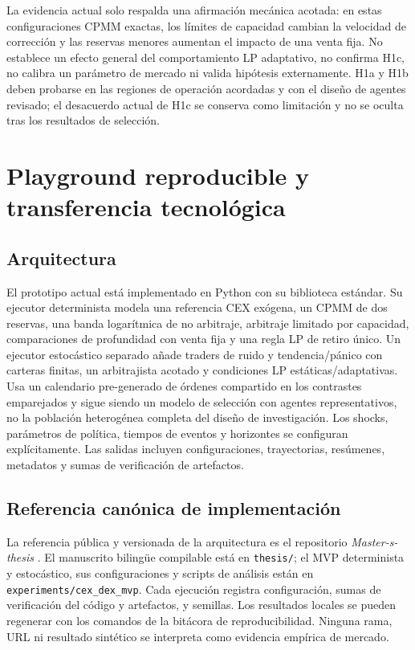 La evidencia actual solo respalda una afirmación mecánica acotada: en estas
configuraciones CPMM exactas, los límites de capacidad cambian la velocidad de
corrección y las reservas menores aumentan el impacto de una venta fija. No establece
un efecto general del comportamiento LP adaptativo, no confirma H1c, no calibra un
parámetro de mercado ni valida hipótesis externamente. H1a y H1b deben probarse en las
regiones de operación acordadas y con el diseño de agentes revisado; el desacuerdo
actual de H1c se conserva como limitación y no se oculta tras los resultados de
selección.

\section{Playground reproducible y transferencia tecnológica}

\subsection{Arquitectura}

El prototipo actual está implementado en Python con su biblioteca estándar. Su ejecutor
determinista modela una referencia CEX exógena, un CPMM de dos reservas, una banda logarítmica
de no arbitraje, arbitraje limitado por capacidad, comparaciones de profundidad con venta
fija y una regla LP de retiro único. Un ejecutor estocástico separado añade traders de
ruido y tendencia/pánico con carteras finitas, un arbitrajista acotado y condiciones LP
estáticas/adaptativas. Usa un calendario pre-generado de órdenes compartido en los
contrastes emparejados y sigue siendo un modelo de selección con agentes representativos,
no la población heterogénea completa del diseño de investigación. Los shocks, parámetros
de política, tiempos de eventos y horizontes se configuran explícitamente. Las salidas
incluyen configuraciones, trayectorias, resúmenes, metadatos y sumas de verificación de
artefactos.

\subsection{Referencia canónica de implementación}

La referencia pública y versionada de la arquitectura es el repositorio
\textit{Master-s-thesis} \cite{calderon2026repository}. El manuscrito bilingüe
compilable está en \texttt{thesis/}; el MVP determinista y estocástico, sus
configuraciones y scripts de análisis están en \texttt{experiments/cex\_dex\_mvp}.
Cada ejecución registra configuración, sumas de verificación del código y artefactos,
y semillas. Los resultados locales se pueden regenerar con los comandos de la bitácora
de reproducibilidad. Ninguna rama, URL ni resultado sintético se interpreta como
evidencia empírica de mercado.

